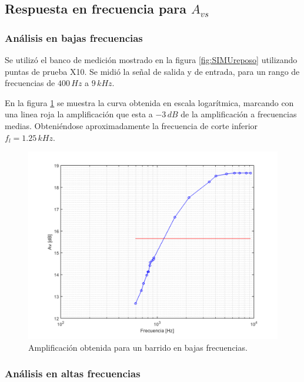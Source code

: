 \documentclass[10pt,spanish,a4paper,notitlepage]{article}
\begin{document}
\subsection{Respuesta en frecuencia para \texorpdfstring{$A_{vs}$}{TEXT}}

\subsubsection{Análisis en bajas frecuencias}

Se utilizó el banco de medición mostrado en la figura
\ref{fig:SIMUreposo} utilizando puntas de prueba X10.
Se midió la señal de salida y de entrada, para un rango
de frecuencias de $400\,\unit{Hz}$ a $9\,\unit{kHz}$.

En la figura \ref{fig:medicion_bajas_frecuencias} se muestra
la curva obtenida en escala logarítmica, marcando con una
linea roja la amplificación que esta a $-3\,\unit{dB}$ de
la amplificación a frecuencias medias.
Obteniéndose aproximadamente la frecuencia de corte
inferior $f_l = 1.25\,\unit{kHz}$.

\begin{figure}[H]
\centering
\includegraphics[scale=0.6]{mediciones/bajas_frecuencias.png}
\caption{Amplificación obtenida para un barrido en bajas frecuencias.}
\label{fig:medicion_bajas_frecuencias}
\end{figure}

\subsubsection{Análisis en altas frecuencias}
\end{document}
